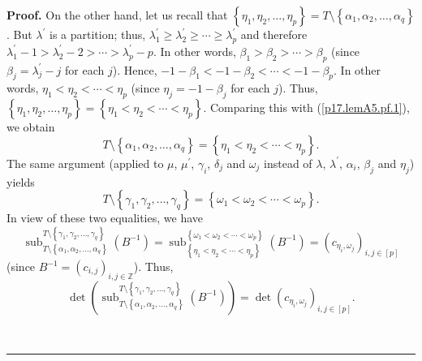\documentclass[numbers=enddot,12pt,final,onecolumn,notitlepage]{scrartcl}%
\theoremstyle{definition}
\newenvironment{proof}[1][Proof]{\noindent\textbf{#1.} }{\ \rule{0.5em}{0.5em}}
\begin{document}
\begin{enumerate}
\begin{proof}
On the other hand, let us recall that $\left\{  \eta_{1},\eta_{2},\ldots
,\eta_{p}\right\}  =T\setminus\left\{  \alpha_{1},\alpha_{2},\ldots,\alpha
_{q}\right\}  $. But $\lambda^{\prime}$ is a partition; thus, $\lambda
_{1}^{\prime}\geq\lambda_{2}^{\prime}\geq\cdots\geq\lambda_{p}^{\prime}$ and
therefore $\lambda_{1}^{\prime}-1>\lambda_{2}^{\prime}-2>\cdots>\lambda
_{p}^{\prime}-p$. In other words, $\beta_{1}>\beta_{2}>\cdots>\beta_{p}$
(since $\beta_{j}=\lambda_{j}^{\prime}-j$ for each $j$). Hence, $-1-\beta
_{1}<-1-\beta_{2}<\cdots<-1-\beta_{p}$. In other words, $\eta_{1}<\eta
_{2}<\cdots<\eta_{p}$ (since $\eta_{j}=-1-\beta_{j}$ for each $j$). Thus,
$\left\{  \eta_{1},\eta_{2},\ldots,\eta_{p}\right\}  =\left\{  \eta_{1}%
<\eta_{2}<\cdots<\eta_{p}\right\}  $. Comparing this with
(\ref{p17.lemA5.pf.1}), we obtain%
\[
T\setminus\left\{  \alpha_{1},\alpha_{2},\ldots,\alpha_{q}\right\}  =\left\{
\eta_{1}<\eta_{2}<\cdots<\eta_{p}\right\}  .
\]
The same argument (applied to $\mu$, $\mu^{\prime}$, $\gamma_{i}$, $\delta
_{j}$ and $\omega_{j}$ instead of $\lambda$, $\lambda^{\prime}$, $\alpha_{i}$,
$\beta_{j}$ and $\eta_{j}$) yields%
\[
T\setminus\left\{  \gamma_{1},\gamma_{2},\ldots,\gamma_{q}\right\}  =\left\{
\omega_{1}<\omega_{2}<\cdots<\omega_{p}\right\}  .
\]
In view of these two equalities, we have%
\[
\operatorname*{sub}\nolimits_{T\setminus\left\{  \alpha_{1},\alpha_{2}%
,\ldots,\alpha_{q}\right\}  }^{T\setminus\left\{  \gamma_{1},\gamma_{2}%
,\ldots,\gamma_{q}\right\}  }\left(  B^{-1}\right)  =\operatorname*{sub}%
\nolimits_{\left\{  \eta_{1}<\eta_{2}<\cdots<\eta_{p}\right\}  }^{\left\{
\omega_{1}<\omega_{2}<\cdots<\omega_{p}\right\}  }\left(  B^{-1}\right)
=\left(  c_{\eta_{i},\omega_{j}}\right)  _{i,j\in\left[  p\right]  }%
\]
(since $B^{-1}=\left(  c_{i,j}\right)  _{i,j\in\mathbb{Z}}$). Thus,%
\begin{equation}
\det\left(  \operatorname*{sub}\nolimits_{T\setminus\left\{  \alpha_{1}%
,\alpha_{2},\ldots,\alpha_{q}\right\}  }^{T\setminus\left\{  \gamma_{1}%
,\gamma_{2},\ldots,\gamma_{q}\right\}  }\left(  B^{-1}\right)  \right)
=\det\left(  c_{\eta_{i},\omega_{j}}\right)  _{i,j\in\left[  p\right]  }.
\label{p17.lemA5.pf.6}%
\end{equation}



\end{proof}
\end{enumerate}
\end{document}
